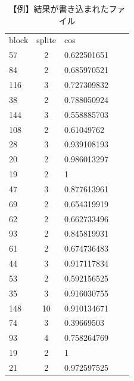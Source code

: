 \documentclass[a4paper,10pt,onecolumn,oneside,openany]{jsbook}
\begin{document}
\begin{table}[h]
 \caption{【例】結果が書き込まれたファイル}
 \label{resultex}
 \begin{center}
\begin{tabular}{lclcl}
block & splite & cos \\
57 & 2 & 0.622501651 \\
84 & 2 & 0.685970521 \\
116 & 3 & 0.727309832 \\
38 & 2 & 0.788050924 \\
144 & 3 & 0.558885703 \\
108 & 2 & 0.61049762 \\
28 & 3 & 0.939108193 \\
20 & 2 & 0.986013297 \\
19 & 2 & 1 \\
47 & 3 & 0.877613961 \\
69 & 2 & 0.654319919 \\
62 & 2 & 0.662733496 \\
93 & 2 & 0.845819931 \\
61 & 2 & 0.674736483 \\
44 & 3 & 0.917117834 \\
53 & 2 & 0.592156525 \\
35 & 3 & 0.916030755 \\
148 & 10 & 0.910134671 \\
74 & 3 & 0.39669503 \\
93 & 4 & 0.758264769 \\
19 & 2 & 1 \\
21 & 2 & 0.972597525 \\
\end{tabular}
\end{center}
\end{table}


\end{document}
